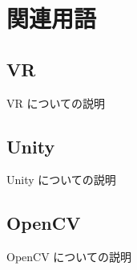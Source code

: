 \section{関連用語}

\subsection{VR}
VR についての説明

\subsection{Unity}
Unity についての説明

\subsection{OpenCV}
OpenCV についての説明